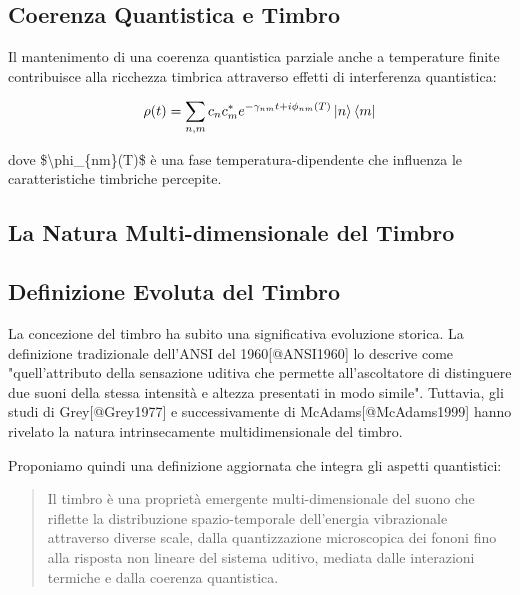 \documentclass[a4paper,11pt]{article}
\begin{document}
\subsection{Coerenza Quantistica e Timbro}\hypertarget{coerenza-quantistica-e-timbro}{}\label{coerenza-quantistica-e-timbro}

Il mantenimento di una coerenza quantistica parziale anche a temperature
finite contribuisce alla ricchezza timbrica attraverso effetti di
interferenza quantistica:

\begin{displaymath}
\rho(t) = \sum_{n,m} c_n c_m^* e^{-\gamma_{nm}t + i\phi_{nm}(T)} \ket{n}\bra{m}
\end{displaymath}

dove \$\textbackslash{}phi\_\{nm\}(T)\$ è una fase temperatura-dipendente che influenza le
caratteristiche timbriche percepite.

\subsection{La Natura Multi-dimensionale del Timbro}\hypertarget{la-natura-multi-dimensionale-del-timbro-1}{}\label{la-natura-multi-dimensionale-del-timbro-1}

\subsection{Definizione Evoluta del Timbro}\hypertarget{definizione-evoluta-del-timbro}{}\label{definizione-evoluta-del-timbro}

La concezione del timbro ha subito una significativa evoluzione storica.
La definizione tradizionale dell'ANSI del 1960{[}@ANSI1960{]} lo descrive
come "quell'attributo della sensazione uditiva che permette
all'ascoltatore di distinguere due suoni della stessa intensità e
altezza presentati in modo simile". Tuttavia, gli studi di
Grey{[}@Grey1977{]} e successivamente di McAdams{[}@McAdams1999{]} hanno
rivelato la natura intrinsecamente multidimensionale del timbro.

Proponiamo quindi una definizione aggiornata che integra gli aspetti
quantistici:

\begin{quote}
Il timbro è una proprietà emergente multi-dimensionale del suono che
riflette la distribuzione spazio-temporale dell'energia vibrazionale
attraverso diverse scale, dalla quantizzazione microscopica dei fononi
fino alla risposta non lineare del sistema uditivo, mediata dalle
interazioni termiche e dalla coerenza quantistica.
\end{quote}
\end{document}

